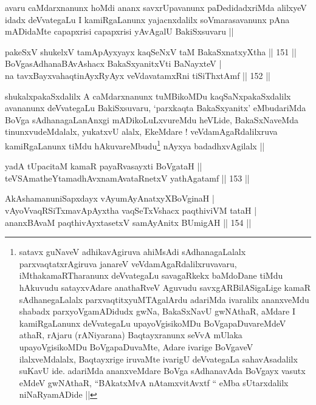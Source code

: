 \begin{artha}
avaru caMdarxnanunx hoMdi ananx savxrUpavanunx paDedidadxriMda
alilxyeV idadx deVvategaLu I kamiRgaLanunx yajacnxdalilx
soVmarasavanunx pAna mADidaMte capapxrisi capapxrisi yAvAgalU
BakiSxsuvaru ||
\end{artha}

\begin{shl}
pakeSxV shukelxV tamApAyxyayx kaqSeNxV taM BakaSxnatxyXtha \hfill|| 151 || \\
BoVgasAdhanaBAvAshacx BakaSxyanitxVti BaNayxteV | \\
na tavxBayxvahaqtinAyxRyAyx veVdavatamxRni tiSiThxtAmf \hfill|| 152 || 
\end{shl}

\begin{artha}
shukalxpakaSxdalilx A caMdarxnanunx tuMBikoMDu kaqSaNxpakaSxdalilx
avananunx deVvategaLu BakiSxsuvaru, `parxkaqta BakaSxyanitx'
eMbudariMda BoVga sAdhanagaLanAnxgi mADikoLuLxvureMdu heVLide,
BakaSxNaveMda tinunxvudeMdalalx, yukatxvU alalx, EkeMdare !
veVdamAgaRdalilxruva kamiRgaLanunx tiMdu hAkuvareMbudu\footnote{satavx
  guNaveV adhikavAgiruva ahiMsAdi sAdhanagaLalalx parxvaqtatxrAgiruva
  janareV veVdamAgaRdalilxruvavaru, iMthakamaRTharanunx deVvategaLu
  savagaRkekx baMdoDane tiMdu hAkuvudu satayxvAdare anathaRveV Aguvudu
  savxgARBilASigaLige kamaR sAdhanegaLalalx parxvaqtitxyuMTAgalArdu
  adariMda ivaralilx ananxveMdu shabadx parxyoVgamADidudx gwNa,
  BakaSxNavU gwNAthaR, aMdare I kamiRgaLanunx deVvategaLu
  upayoVgisikoMDu BoVgapaDuvareMdeV athaR, rAjaru (rANiyarana)
  Baqtayxranunx seVvA mUlaka upayoVgisikoMDu BoVgapaDuvaMte, Adare
  ivarige BoVgaveV ilalxveMdalalx, Baqtayxrige iruvaMte ivarigU
  deVvategaLa sahavAsadalilx suKavU ide. adariMda ananxveMdare BoVga
  sAdhanavAda BoVgayx vasutx eMdeV gwNAthaR, ``BAkatxMvA\s
  nAtamxvitAvxtf `` eMba sUtarxdalilx niNaRyamADide ||} nAyxya badadhxvAgilalx ||
\end{artha}


\begin{shl}
yadA tUpacitaM kamaR payaRvasayxti BoVgataH || \\
teVSAmatheYtamadhAvxnamAvataRnetxV yathAgatamf \hfill|| 153 || 
\end{shl}

\begin{shl}
AkAshamanuniSapxdayx vAyumAyAnatxyXBoVginaH | \\
vAyoVvaqRSiTxmavApAyxtha vaqSeTxVshacx paqthiviVM tataH | \\
ananxBAvaM paqthivAyx\s tasetxV samAyAnitx BUmigAH \hfill|| 154 || 
\end{shl}

